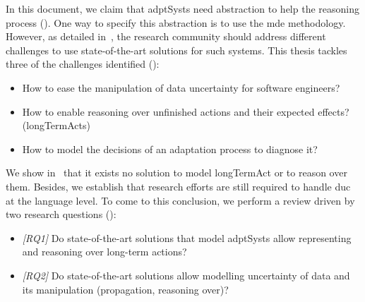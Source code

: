 In this document, we claim that \glspl{adptSyst} need abstraction to help the reasoning process (\cf {}).
One way to specify this abstraction is to use the \gls{mde} methodology.
However, as detailed in~, the research community should address different challenges to use state-of-the-art solutions for such systems.
This thesis tackles three of the challenges identified (\cf {}):
\begin{itemize}
	\item How to ease the manipulation of data uncertainty for software engineers?
	\item How to enable reasoning over unfinished actions and their expected effects? (\glspl{longTermAct})
	\item How to model the decisions of an adaptation process to diagnose it?
\end{itemize}

We show in~ that it exists no solution to model \gls{longTermAct} or to reason over them.
Besides, we establish that research efforts are still required to handle \gls{duc} at the language level.
To come to this conclusion, we perform a review driven by two research questions (\cf {}):
\begin{itemize}
	\item \textit{[RQ1]} Do state-of-the-art solutions that model \glspl{adptSyst} allow representing and reasoning over long-term actions?
	\item \textit{[RQ2]} Do state-of-the-art solutions allow modelling uncertainty of data and its manipulation (propagation, reasoning over)?
\end{itemize}

